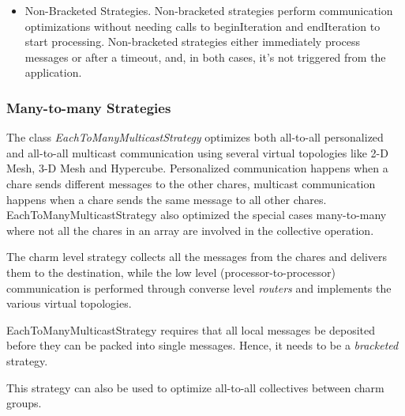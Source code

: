 {\begin{itemize}
\begin{alltt}
ComlibEndIteration(dproxy);
\end{alltt}

\item Non-Bracketed Strategies. Non-bracketed strategies perform communication
optimizations without needing calls to beginIteration and endIteration to start
processing. Non-bracketed strategies either immediately process messages or
after a timeout, and, in both cases, it's not triggered from the application.

\end{itemize}


\subsubsection{Many-to-many Strategies}

The class {\em EachToManyMulticastStrategy} optimizes both all-to-all
personalized and all-to-all multicast communication using several virtual
topologies like 2-D Mesh, 3-D Mesh and Hypercube. Personalized communication
happens when a chare sends different messages to the other chares, multicast
communication happens when a chare sends the same message to all other chares.
EachToManyMulticastStrategy also optimized the special cases many-to-many where
not all the chares in an array are involved in the collective operation.

The charm level strategy collects all the messages from the chares and delivers
them to the destination, while the low level (processor-to-processor)
communication is performed through converse level {\em routers} and
implements the various virtual topologies.



EachToManyMulticastStrategy requires that all local messages be deposited
before they can be packed into single messages. Hence, it needs to be a {\em
bracketed} strategy.

This strategy can also be used to optimize all-to-all collectives between charm
groups.

}
